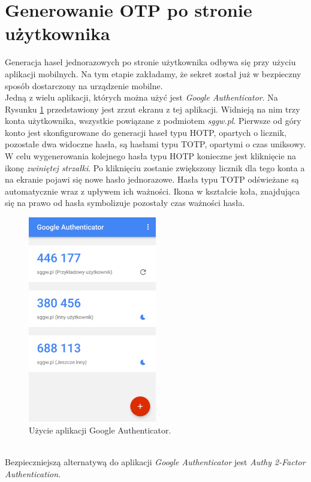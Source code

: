\section{Generowanie OTP po stronie użytkownika}
Generacja haseł jednorazowych po stronie użytkownika odbywa się przy użyciu aplikacji mobilnych. 
Na tym etapie zakładamy, że sekret został już w bezpieczny sposób dostarczony na urządzenie mobilne. \\
Jedną z wielu aplikacji, których można użyć jest \textit{Google Authenticator}. 
Na Rysunku \ref{mobile-google} przedstawiony jest zrzut ekranu z tej aplikacji. 
Widnieją na nim trzy konta użytkownika, wszystkie powiązane z podmiotem \textit{sggw.pl}. 
Pierwsze od góry konto jest skonfigurowane do generacji haseł typu HOTP, opartych o licznik,
pozostałe dwa widoczne hasła, są hasłami typu TOTP, opartymi o czas uniksowy.
W celu wygenerowania kolejnego hasła typu HOTP konieczne jest kliknięcie na ikonę \textit{zwiniętej strzałki}.
Po kliknięciu zostanie zwiększony licznik dla tego konta a na ekranie pojawi się nowe hasło jednorazowe.
Hasła typu TOTP odświeżane są automatycznie wraz z upływem ich ważności. 
Ikona w kształcie koła, znajdująca się na prawo od hasła symbolizuje pozostały czas ważności hasła.
\begin{figure}[t]
    \centering
	\includegraphics[width=0.5\textwidth]{content/images/mobile-google}
	\caption{Użycie aplikacji Google Authenticator.}
    \label{mobile-google}
\end{figure} \\
Bezpieczniejszą alternatywą do aplikacji \textit{Google Authenticator} jest \textit{Authy 2-Factor Authentication}. 
